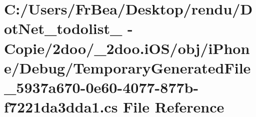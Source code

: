 \hypertarget{i_o_s_2obj_2i_phone_2_debug_2_temporary_generated_file__5937a670-0e60-4077-877b-f7221da3dda1_8cs}{
\section{C:/Users/FrBea/Desktop/rendu/DotNet\_\-todolist\_ - Copie/2doo/\_\-2doo.iOS/obj/iPhone/Debug/TemporaryGeneratedFile\_\-5937a670-0e60-4077-877b-f7221da3dda1.cs File Reference}
\label{i_o_s_2obj_2i_phone_2_debug_2_temporary_generated_file__5937a670-0e60-4077-877b-f7221da3dda1_8cs}
}
